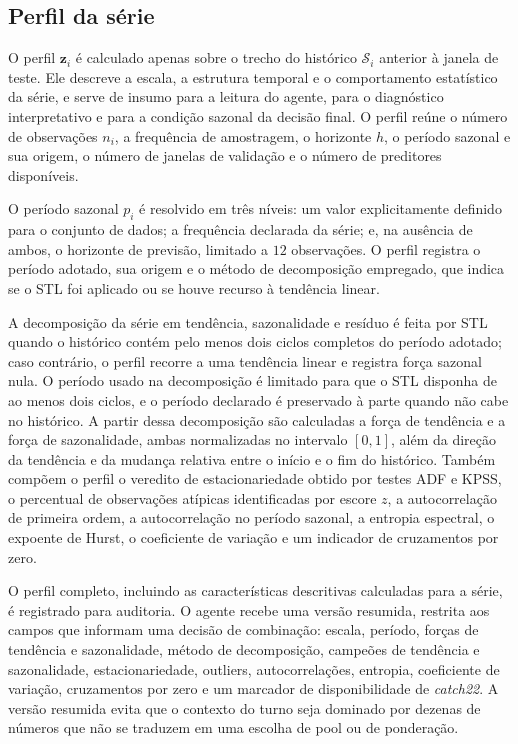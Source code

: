 \subsection{Perfil da série}

O perfil $\mathbf{z}_i$ é calculado apenas sobre o trecho do histórico $\mathcal{S}_i$ anterior à janela de teste. Ele descreve a escala, a estrutura temporal e o comportamento estatístico da série, e serve de insumo para a leitura do agente, para o diagnóstico interpretativo e para a condição sazonal da decisão final. O perfil reúne o número de observações $n_i$, a frequência de amostragem, o horizonte $h$, o período sazonal e sua origem, o número de janelas de validação e o número de preditores disponíveis.

O período sazonal $p_i$ é resolvido em três níveis: um valor explicitamente definido para o conjunto de dados; a frequência declarada da série; e, na ausência de ambos, o horizonte de previsão, limitado a $12$ observações. O perfil registra o período adotado, sua origem e o método de decomposição empregado, que indica se o STL foi aplicado ou se houve recurso à tendência linear.

A decomposição da série em tendência, sazonalidade e resíduo é feita por STL quando o histórico contém pelo menos dois ciclos completos do período adotado; caso contrário, o perfil recorre a uma tendência linear e registra força sazonal nula. O período usado na decomposição é limitado para que o STL disponha de ao menos dois ciclos, e o período declarado é preservado à parte quando não cabe no histórico. A partir dessa decomposição são calculadas a força de tendência e a força de sazonalidade, ambas normalizadas no intervalo $[0,1]$, além da direção da tendência e da mudança relativa entre o início e o fim do histórico. Também compõem o perfil o veredito de estacionariedade obtido por testes ADF e KPSS, o percentual de observações atípicas identificadas por escore $z$, a autocorrelação de primeira ordem, a autocorrelação no período sazonal, a entropia espectral, o expoente de Hurst, o coeficiente de variação e um indicador de cruzamentos por zero.

O perfil completo, incluindo as características descritivas calculadas para a série, é registrado para auditoria. O agente recebe uma versão resumida, restrita aos campos que informam uma decisão de combinação: escala, período, forças de tendência e sazonalidade, método de decomposição, campeões de tendência e sazonalidade, estacionariedade, outliers, autocorrelações, entropia, coeficiente de variação, cruzamentos por zero e um marcador de disponibilidade de \textit{catch22}. A versão resumida evita que o contexto do turno seja dominado por dezenas de números que não se traduzem em uma escolha de pool ou de ponderação.

